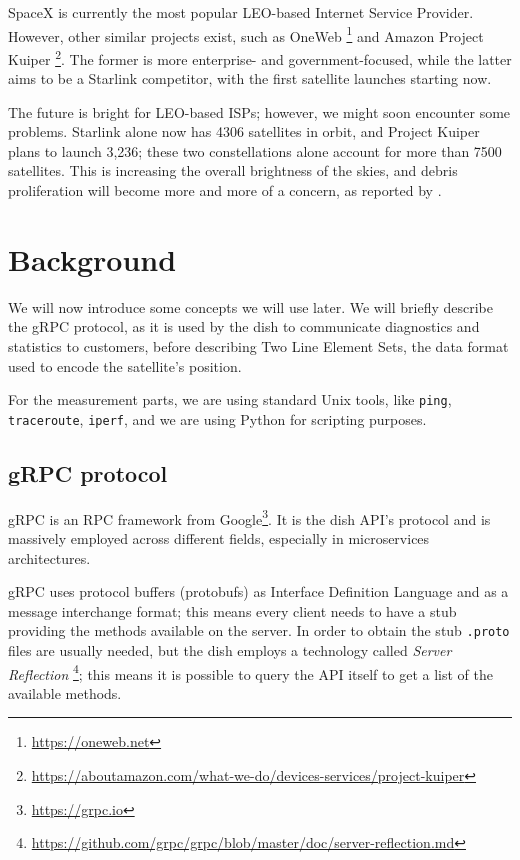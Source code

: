 \documentclass[IN,11pt,twoside,openright,idp,english]{tumthesis}
\begin{document}
SpaceX is currently the most popular LEO-based Internet Service Provider. However, other similar projects exist, such as OneWeb \footnote{\url{https://oneweb.net}} and Amazon Project Kuiper \footnote{\url{https://aboutamazon.com/what-we-do/devices-services/project-kuiper}}. The former is more enterprise- and government-focused, while the latter aims to be a Starlink competitor, with the first satellite launches starting now.

The future is bright for LEO-based ISPs; however, we might soon encounter some problems. Starlink alone now has 4306 satellites in orbit, and Project Kuiper plans to launch 3,236; these two constellations alone account for more than 7500 satellites. This is increasing the overall brightness of the skies, and debris proliferation will become more and more of a concern, as reported by \cite{cite-key}.
    
\section{Background}

We will now introduce some concepts we will use later. We will briefly describe the gRPC protocol, as it is used by the dish to communicate diagnostics and statistics to customers, before describing Two Line Element Sets, the data format used to encode the satellite's position. 

For the measurement parts, we are using standard Unix tools, like \texttt{ping}, \texttt{traceroute}, \texttt{iperf}, and we are using Python for scripting purposes.
    
\subsection{gRPC protocol}
    
gRPC is an RPC framework from Google\footnote{\url{https://grpc.io}}. It is the dish API's protocol and is massively employed across different fields, especially in microservices architectures. 
    
gRPC uses protocol buffers (protobufs) as Interface Definition Language and as a message interchange format; this means every client needs to have a stub providing the methods available on the server. In order to obtain the stub \texttt{.proto} files are usually needed, but the dish employs a technology called \textit{Server Reflection} \footnote{\url{https://github.com/grpc/grpc/blob/master/doc/server-reflection.md}}; this means it is possible to query the API itself to get a list of the available methods.
\end{document}
